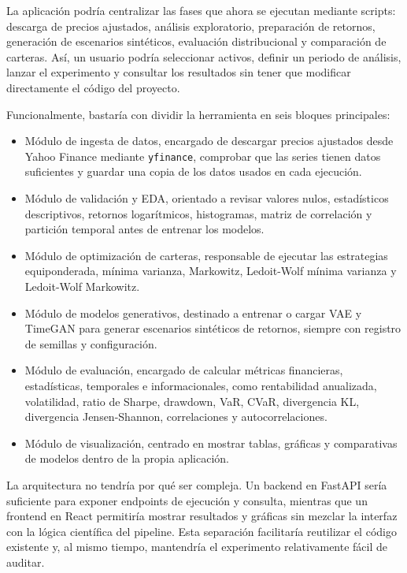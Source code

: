 \documentclass[11pt,a4paper,spanish,oneside]{book}
\numberwithin{equation}{chapter}
\numberwithin{figure}{chapter}
\begin{document}
La aplicación podría centralizar las fases que ahora se ejecutan mediante scripts: descarga de precios ajustados, análisis exploratorio, preparación de retornos, generación de escenarios sintéticos, evaluación distribucional y comparación de carteras. Así, un usuario podría seleccionar activos, definir un periodo de análisis, lanzar el experimento y consultar los resultados sin tener que modificar directamente el código del proyecto.

Funcionalmente, bastaría con dividir la herramienta en seis bloques principales:

\begin{itemize}
\item Módulo de ingesta de datos, encargado de descargar precios ajustados desde Yahoo Finance mediante \texttt{yfinance}, comprobar que las series tienen datos suficientes y guardar una copia de los datos usados en cada ejecución.

\item Módulo de validación y EDA, orientado a revisar valores nulos, estadísticos descriptivos, retornos logarítmicos, histogramas, matriz de correlación y partición temporal antes de entrenar los modelos.

\item Módulo de optimización de carteras, responsable de ejecutar las estrategias equiponderada, mínima varianza, Markowitz, Ledoit-Wolf mínima varianza y Ledoit-Wolf Markowitz.

\item Módulo de modelos generativos, destinado a entrenar o cargar VAE y TimeGAN para generar escenarios sintéticos de retornos, siempre con registro de semillas y configuración.

\item Módulo de evaluación, encargado de calcular métricas financieras, estadísticas, temporales e informacionales, como rentabilidad anualizada, volatilidad, ratio de Sharpe, drawdown, VaR, CVaR, divergencia KL, divergencia Jensen-Shannon, correlaciones y autocorrelaciones.

\item Módulo de visualización, centrado en mostrar tablas, gráficas y comparativas de modelos dentro de la propia aplicación.
\end{itemize}

La arquitectura no tendría por qué ser compleja. Un backend en FastAPI sería suficiente para exponer endpoints de ejecución y consulta, mientras que un frontend en React permitiría mostrar resultados y gráficas sin mezclar la interfaz con la lógica científica del pipeline. Esta separación facilitaría reutilizar el código existente y, al mismo tiempo, mantendría el experimento relativamente fácil de auditar.
\end{document}
